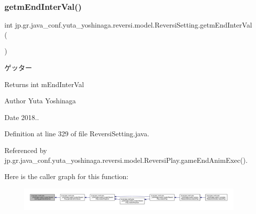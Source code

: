 \subsubsection{\texorpdfstring{getm\+End\+Inter\+Val()}{getmEndInterVal()}}
{\footnotesize\ttfamily int jp.\+gr.\+java\+\_\+conf.\+yuta\+\_\+yoshinaga.\+reversi.\+model.\+Reversi\+Setting.\+getm\+End\+Inter\+Val (\begin{DoxyParamCaption}{ }\end{DoxyParamCaption})}



ゲッター 

\begin{DoxyReturn}{Returns}
int m\+End\+Inter\+Val 
\end{DoxyReturn}
\begin{DoxyAuthor}{Author}
Yuta Yoshinaga 
\end{DoxyAuthor}
\begin{DoxyDate}{Date}
2018.. 
\end{DoxyDate}


Definition at line 329 of file Reversi\+Setting.\+java.



Referenced by jp.\+gr.\+java\+\_\+conf.\+yuta\+\_\+yoshinaga.\+reversi.\+model.\+Reversi\+Play.\+game\+End\+Anim\+Exec().

Here is the caller graph for this function\+:
\nopagebreak
\begin{figure}[H]
\begin{center}
\leavevmode
\includegraphics[width=350pt]{classjp_1_1gr_1_1java__conf_1_1yuta__yoshinaga_1_1reversi_1_1model_1_1_reversi_setting_a35f2248862e0e35bc4eaec74b39a45a0_icgraph}
\end{center}
\end{figure}
\mbox{\label{classjp_1_1gr_1_1java__conf_1_1yuta__yoshinaga_1_1reversi_1_1model_1_1_reversi_setting_a16bc06302ae7ad228d4b7436958e9f20}} 
